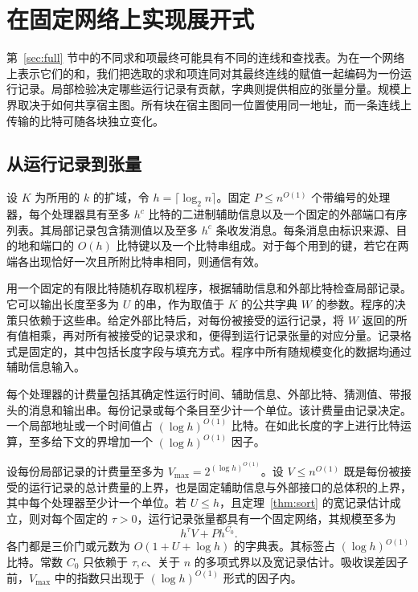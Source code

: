 \section{在固定网络上实现展开式}\label{sec:assembly}

第~\ref{sec:full} 节中的不同求和项最终可能具有不同的连线和查找表。为在一个网络上表示它们的和，我们把选取的求和项连同对其最终连线的赋值一起编码为一份运行记录。局部检验决定哪些运行记录有贡献，字典则提供相应的张量分量。规模上界取决于如何共享宿主图。所有块在宿主图同一位置使用同一地址，而一条连线上传输的比特可随各块独立变化。

\subsection{从运行记录到张量}

设 $K$ 为所用的 $k$ 的扩域，令 $h=\lceil\log_2 n\rceil$。固定 $P\le n^{O(1)}$ 个带编号的处理器，每个处理器具有至多 $h^c$ 比特的二进制辅助信息以及一个固定的外部端口有序列表。其局部记录包含猜测值以及至多 $h^c$ 条收发消息。每条消息由标识来源、目的地和端口的 $O(h)$ 比特键以及一个比特串组成。对于每个用到的键，若它在两端各出现恰好一次且所附比特串相同，则通信有效。

用一个固定的有限比特随机存取机程序，根据辅助信息和外部比特检查局部记录。它可以输出长度至多为 $U$ 的串，作为取值于 $K$ 的公共字典 $W$ 的参数。程序的决策只依赖于这些串。给定外部比特后，对每份被接受的运行记录，将 $W$ 返回的所有值相乘，再对所有被接受的记录求和，便得到运行记录张量的对应分量。记录格式是固定的，其中包括长度字段与填充方式。程序中所有随规模变化的数据均通过辅助信息输入。

每个处理器的计费量包括其确定性运行时间、辅助信息、外部比特、猜测值、带报头的消息和输出串。每份记录或每个条目至少计一个单位。该计费量由记录决定。一个局部地址或一个时间值占 $(\log h)^{O(1)}$ 比特。在如此长度的字上进行比特运算，至多给下文的界增加一个 $(\log h)^{O(1)}$ 因子。

\begin{lemma}[运行记录的实现]\label{lem:fixed-transcript}
设每份局部记录的计费量至多为 $V_{\max}=2^{(\log h)^{O(1)}}$。设 $V\le n^{O(1)}$ 既是每份被接受的运行记录的总计费量的上界，也是固定辅助信息与外部接口的总体积的上界，其中每个处理器至少计一个单位。若 $U\le h$，且定理~\ref{thm:sort} 的宽记录估计成立，则对每个固定的 $\tau>0$，运行记录张量都具有一个固定网络，其规模至多为
\[
                          h^\tau V+P h^{C_0}.
\]
各门都是三价门或元数为 $O(1+U+\log h)$ 的字典表。其标签占 $(\log h)^{O(1)}$ 比特。常数 $C_0$ 只依赖于 $\tau,c$、关于 $n$ 的多项式界以及宽记录估计。吸收误差因子前，$V_{\max}$ 中的指数只出现于 $(\log h)^{O(1)}$ 形式的因子内。
\end{lemma}

